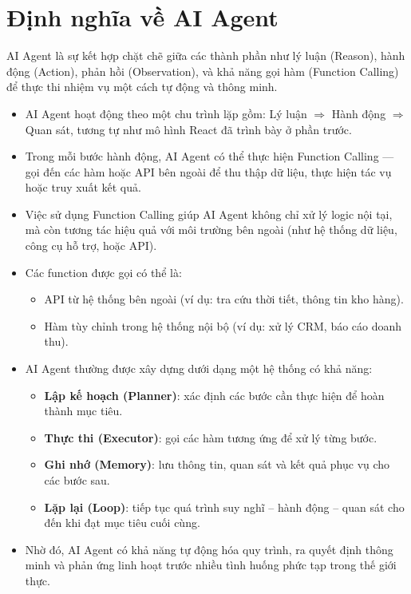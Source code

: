 \documentclass[final,letterpaper,twoside,12pt]{report}
\begin{document}
\section{Định nghĩa về AI Agent}

AI Agent là sự kết hợp chặt chẽ giữa các thành phần như lý luận (Reason), hành động (Action), phản hồi (Observation), và khả năng gọi hàm (Function Calling) để thực thi nhiệm vụ một cách tự động và thông minh.

\begin{itemize}
    \item AI Agent hoạt động theo một chu trình lặp gồm: Lý luận $\Rightarrow$ Hành động $\Rightarrow$ Quan sát, tương tự như mô hình React đã trình bày ở phần trước.
    
    \item Trong mỗi bước hành động, AI Agent có thể thực hiện Function Calling — gọi đến các hàm hoặc API bên ngoài để thu thập dữ liệu, thực hiện tác vụ hoặc truy xuất kết quả.

    \item Việc sử dụng Function Calling giúp AI Agent không chỉ xử lý logic nội tại, mà còn tương tác hiệu quả với môi trường bên ngoài (như hệ thống dữ liệu, công cụ hỗ trợ, hoặc API).

    \item Các function được gọi có thể là: 
    \begin{itemize}
        \item API từ hệ thống bên ngoài (ví dụ: tra cứu thời tiết, thông tin kho hàng).
        \item Hàm tùy chỉnh trong hệ thống nội bộ (ví dụ: xử lý CRM, báo cáo doanh thu).
    \end{itemize}

    \item AI Agent thường được xây dựng dưới dạng một hệ thống có khả năng:
    \begin{itemize}
        \item \textbf{Lập kế hoạch (Planner)}: xác định các bước cần thực hiện để hoàn thành mục tiêu.
        \item \textbf{Thực thi (Executor)}: gọi các hàm tương ứng để xử lý từng bước.
        \item \textbf{Ghi nhớ (Memory)}: lưu thông tin, quan sát và kết quả phục vụ cho các bước sau.
        \item \textbf{Lặp lại (Loop)}: tiếp tục quá trình suy nghĩ – hành động – quan sát cho đến khi đạt mục tiêu cuối cùng.
    \end{itemize}
    
    \item Nhờ đó, AI Agent có khả năng tự động hóa quy trình, ra quyết định thông minh và phản ứng linh hoạt trước nhiều tình huống phức tạp trong thế giới thực.
\end{itemize}

\end{document}
